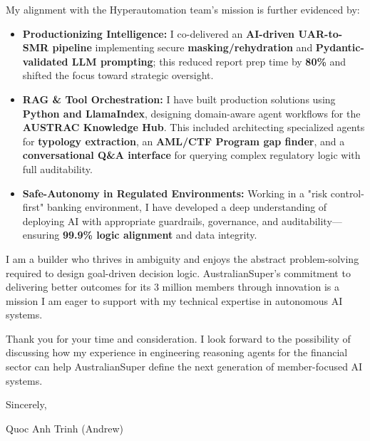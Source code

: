 \documentclass[11pt, a4paper]{article}
\begin{document}
My alignment with the Hyperautomation team’s mission is further evidenced by:
\begin{itemize}
    \item \textbf{Productionizing Intelligence:} I co-delivered an \textbf{AI-driven UAR-to-SMR pipeline} implementing secure \textbf{masking/rehydration} and \textbf{Pydantic-validated LLM prompting}; this reduced report prep time by \textbf{80\%} and shifted the focus toward strategic oversight.
    \item \textbf{RAG \& Tool Orchestration:} I have built production solutions using \textbf{Python and LlamaIndex}, designing domain-aware agent workflows for the \textbf{AUSTRAC Knowledge Hub}. This included architecting specialized agents for \textbf{typology extraction}, an \textbf{AML/CTF Program gap finder}, and a \textbf{conversational Q\&A interface} for querying complex regulatory logic with full auditability.
    \item \textbf{Safe-Autonomy in Regulated Environments:} Working in a "risk control-first" banking environment, I have developed a deep understanding of deploying AI with appropriate guardrails, governance, and auditability—ensuring \textbf{99.9\% logic alignment} and data integrity.
\end{itemize}

I am a builder who thrives in ambiguity and enjoys the abstract problem-solving required to design goal-driven decision logic. AustralianSuper’s commitment to delivering better outcomes for its 3 million members through innovation is a mission I am eager to support with my technical expertise in autonomous AI systems.

Thank you for your time and consideration. I look forward to the possibility of discussing how my experience in engineering reasoning agents for the financial sector can help AustralianSuper define the next generation of member-focused AI systems.

\vspace{2em}

Sincerely,

\vspace{1em}

Quoc Anh Trinh (Andrew)
\end{document}
